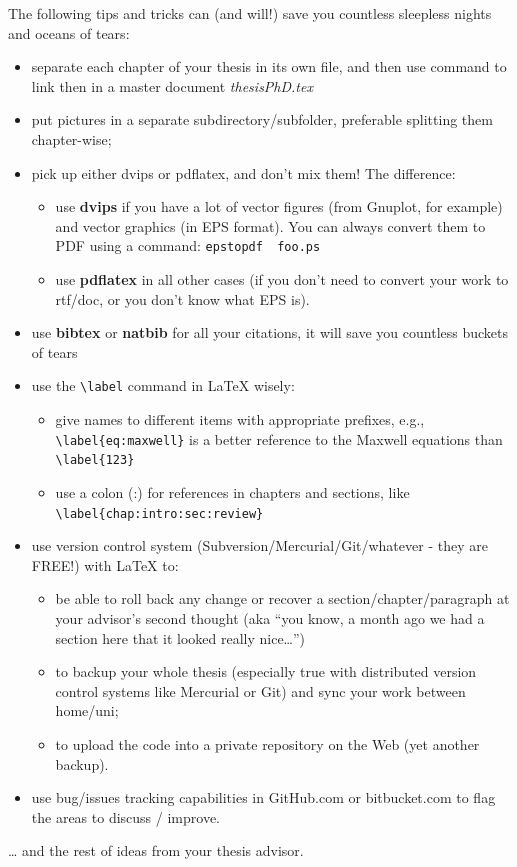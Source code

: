 \documentclass[a4paper,11pt,phdthesis,twoside,oneandhalfspace,pdflatex]{cssethesis} %
\begin{document}
The following tips and tricks can (and will!) save you countless
sleepless nights and oceans of tears:

\begin{itemize}
\item
  separate each chapter of your thesis in its own file, and then use
  \verb|| command to link then in a master document
  \emph{thesisPhD.tex}
\item
  put pictures in a separate subdirectory/subfolder, preferable
  splitting them chapter-wise;
\item
  pick up either dvips or pdflatex,
  and don't mix them!
  The difference:
  \begin{itemize}
  \item
    use \textbf{dvips} if you have a lot of vector figures (from
    Gnuplot, for example) and vector graphics (in EPS format). You can
    always convert them to PDF using a command: \verb|epstopdf  foo.ps|
  \item
    use \textbf{pdflatex} in all other cases (if you don't need to
    convert your work to rtf/doc, or you don't know what EPS is).
  \end{itemize}
\item
  use \textbf{bibtex} or \textbf{natbib} for all your citations, it
  will save you countless buckets of tears
\item
  use the \verb|\label| command in LaTeX wisely:
  \begin{itemize}
  \item
    give names to different items with appropriate prefixes, e.g.,
    \verb|\label{eq:maxwell}| is a better reference to the Maxwell equations
    than \verb|\label{123}|
  \item
    use a colon (:) for references in chapters and sections, like
    \verb|\label{chap:intro:sec:review}|
  \end{itemize}
\item
  use version control system (Subversion/Mercurial/Git/whatever -
  they are FREE!) with LaTeX to:
  \begin{itemize}
  \item
    be able to roll back any change or recover a
    section/chapter/paragraph at your advisor's second thought (aka
    ``you know, a month ago we had a section here that it looked really nice\ldots{}'')
  \item
    to backup your whole thesis (especially true with distributed
    version control systems like Mercurial or Git) and sync your work
    between home/uni;
  \item
    to upload the code into a private repository on the Web (yet
    another backup).
  \end{itemize}
\item
  use bug/issues tracking capabilities in GitHub.com or bitbucket.com
  to flag the areas to discuss / improve.
\end{itemize}
\ldots{} and the rest of ideas from your thesis advisor.
\end{document}
